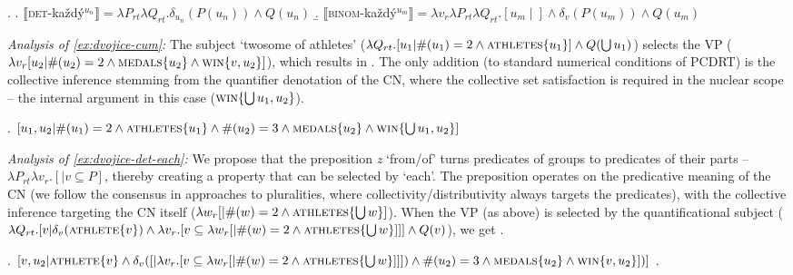 \documentclass[12pt, a4paper]{scrartcl}
\newcommand{\lb}{\llbracket}
\newcommand{\rb}{\rrbracket}
\newcommand{\sx}[1]{$\lb${#1}$\rb$}
\begin{document}
\ex. \label{def:each}\a. \sx{\textsc{det}-každý$^{u_n}$}${}=\lambda P_{rt}\lambda Q_{rt}.\delta_{u_n}(P(u_n)) \wedge Q(u_n)$\label{def:each-det}
\b. \sx{\textsc{binom}-každý$^{u_m}$}${}=\lambda v_r\lambda P_{rt}\lambda Q_{rt}.[u_m\mid] \wedge \delta_{v}(P(u_m)) \wedge Q(u_m)$\label{def:each-bin}

\textit{Analysis of \ref{ex:dvojice-cum}:} The subject `twosome of athletes' ($\lambda Q_{rt}.[u_1| \#(u_1)=2 \wedge \textsc{athletes}\{u_1\}] \wedge Q(\bigcup u_1)$) selects the VP ($\lambda v_r[u_2 | \#(u_2)=2 \wedge \textsc{medals}\{u_2\} \wedge \textsc{win}\{v,u_2\}]$), which results in \Next. The only addition (to standard numerical conditions of PCDRT) is the collective inference stemming from the quantifier denotation of the CN, where the collective set satisfaction is required in the nuclear scope -- the internal argument in this case ($\textsc{win}\{\bigcup u_1,u_2\}$).\vspace{-4pt}

\ex. $[u_1, u_2| \#(u_1)=2\wedge\textsc{athletes}\{u_1\} \wedge \#(u_2)=3 \wedge \textsc{medals}\{u_2\} \wedge \textsc{win}\{\bigcup u_1,u_2\}]$\vspace{-4pt}


 
\textit{Analysis of \ref{ex:dvojice-det-each}:} We propose that the preposition \textit{z} `from/of' turns predicates of groups to predicates of their parts -- $\lambda P_{rt}\lambda v_r.[| v\subseteq P]$, thereby creating a property that can be selected by `each'. The preposition operates on the predicative meaning of the CN (we follow the consensus in approaches to pluralities, where collectivity/distributivity always targets the predicates), with the collective inference targeting the CN itself ($\lambda w_r[|\#(w)=2 \wedge \textsc{athletes}\{\bigcup w\}]$). When the VP (as above) is selected by the quantificational subject ($\lambda Q_{rt}.[v|\delta_{v}(\textsc{athlete}\{v\}) \wedge \lambda v_r.[v \subseteq \lambda w_r[|\#(w)=2 \wedge \textsc{athletes}\{\bigcup w\}]]] \wedge Q(v)$), we get \Next.\vspace{-4pt}

\ex. $[v,u_2|  \textsc{athlete}\{v\} \wedge \delta_{v}([|\lambda v_r.[v \subseteq \lambda w_r[|\#(w)=2 \wedge \textsc{athletes}\{\bigcup w\}]]]) \wedge \#(u_2)=3 \wedge \textsc{medals}\{u_2\} \wedge \textsc{win}\{v, u_2\}])]$\vspace{-4pt}
\z.
\end{document}
